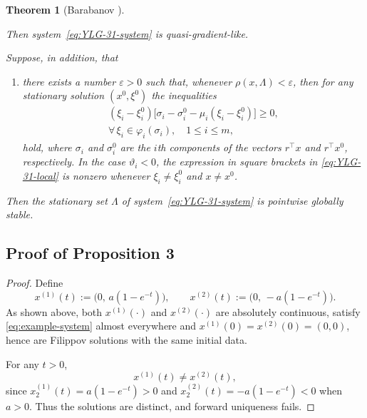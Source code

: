 \documentclass[journal]{IEEEtran}
\newtheorem{theorem}{Theorem}
\newtheorem{proof}{Proof}
\begin{document}
\begin{theorem}[Barabanov {\cite[Thm.~3.1]{YLG}}]
\begin{enumerate}
\end{enumerate}
Then system~\eqref{eq:YLG-31-system} is \emph{quasi-gradient-like}.

Suppose, in addition, that
\begin{enumerate}%
\item there exists a number $\varepsilon>0$ such that, whenever
$\rho(x,\Lambda)<\varepsilon$, then for any stationary solution
$(x^0,\xi^0)$ the inequalities
\begin{multline}
  (\xi_i-\xi_i^0)\bigl[\sigma_i-\sigma_i^0-\mu_i(\xi_i-\xi_i^0)\bigr]\ge0,
  \\ \forall\,\xi_i\in\varphi_i(\sigma_i), \quad 1\le i\le m,
  \label{eq:YLG-31-local}
\end{multline}
hold, where $\sigma_i$ and $\sigma_i^0$ are the $i$th components of the
vectors $r^{\top}x$ and $r^{\top}x^0$, respectively. In the case
$\vartheta_i<0$, the expression in square brackets in
\eqref{eq:YLG-31-local} is nonzero whenever $\xi_i\neq\xi_i^0$ and
$x\neq x^0$.
\end{enumerate}
Then the stationary set $\Lambda$ of system~\eqref{eq:YLG-31-system}
is \emph{pointwise globally stable}.
\end{theorem}

\subsection{Proof of Proposition 3}\label{prop3_proof}
\begin{proof}
Define
\[
x^{(1)}(t):=\bigl(0,\,a(1-e^{-t})\bigr),\qquad x^{(2)}(t):=\bigl(0,\,-a(1-e^{-t})\bigr).
\]
As shown above, both $x^{(1)}(\cdot)$ and $x^{(2)}(\cdot)$ are absolutely continuous, satisfy \eqref{eq:example-system} almost everywhere and $x^{(1)}(0)=x^{(2)}(0)=(0,0)$, hence are Filippov solutions with the same initial data.

For any $t>0$,
\[
x^{(1)}(t)\neq x^{(2)}(t),
\]
since $x_{2}^{(1)}(t)=a(1-e^{-t})>0$ and $x_{2}^{(2)}(t)=-a(1-e^{-t})<0$ when $a>0$. Thus the solutions are distinct, and forward uniqueness fails.
\end{proof}

\end{document}
